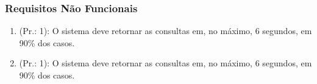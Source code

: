 \subsubsection{Requisitos Não Funcionais}
\begin{enumerate}[
	label=RNF\arabic{*}, 
	ref=(RNF\arabic{*}),
	leftmargin=1.5em,
	itemindent=4.5em]
\item (Pr.: 1): O sistema deve retornar as consultas em, no máximo, 6 segundos, em 90\% dos casos.
\item (Pr.: 1): O sistema deve retornar as consultas em, no máximo, 6 segundos, em 90\% dos casos.
\end{enumerate}
